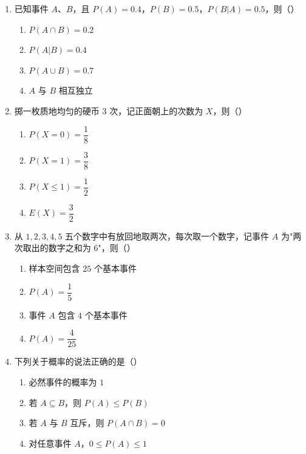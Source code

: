 \documentclass[12pt, a4paper]{ctexart}
\begin{document}
\begin{enumerate}[resume]
\item 已知事件 $A$、$B$，且 $P(A)=0.4$，$P(B)=0.5$，$P(B|A)=0.5$，则（\quad）
  \begin{enumerate}[label=\Alph*., itemsep=0pt]
    \item $P(A\cap B)=0.2$
    \item $P(A|B)=0.4$
    \item $P(A\cup B)=0.7$
    \item $A$ 与 $B$ 相互独立
  \end{enumerate}

\item 掷一枚质地均匀的硬币 $3$ 次，记正面朝上的次数为 $X$，则（\quad）
  \begin{enumerate}[label=\Alph*., itemsep=0pt]
    \item $P(X=0)=\dfrac{1}{8}$
    \item $P(X=1)=\dfrac{3}{8}$
    \item $P(X\leqslant 1)=\dfrac{1}{2}$
    \item $E(X)=\dfrac{3}{2}$
  \end{enumerate}

\item 从 $1,2,3,4,5$ 五个数字中有放回地取两次，每次取一个数字，记事件 $A$ 为"两次取出的数字之和为 $6$"，则（\quad）
  \begin{enumerate}[label=\Alph*., itemsep=0pt]
    \item 样本空间包含 $25$ 个基本事件
    \item $P(A)=\dfrac{1}{5}$
    \item 事件 $A$ 包含 $4$ 个基本事件
    \item $P(A)=\dfrac{4}{25}$
  \end{enumerate}

\item 下列关于概率的说法正确的是（\quad）
  \begin{enumerate}[label=\Alph*., itemsep=0pt]
    \item 必然事件的概率为 $1$
    \item 若 $A\subseteq B$，则 $P(A)\leqslant P(B)$
    \item 若 $A$ 与 $B$ 互斥，则 $P(A\cap B)=0$
    \item 对任意事件 $A$，$0\leqslant P(A)\leqslant 1$
  \end{enumerate}
\end{enumerate}

\vspace{6pt}
\end{document}
